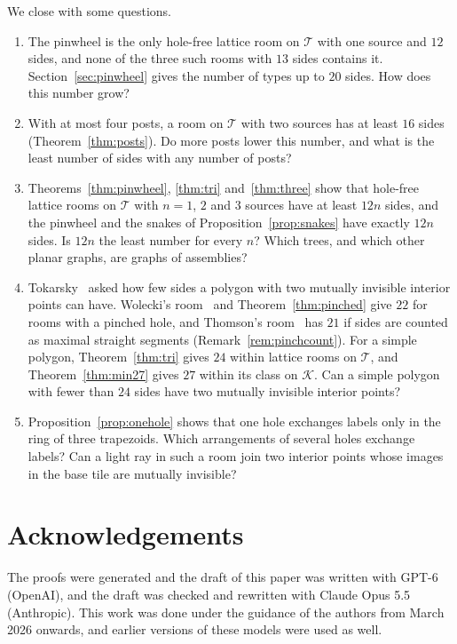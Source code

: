 \documentclass[11pt,a4paper]{article}
\theoremstyle{plain}
\theoremstyle{definition}
\theoremstyle{remark}
\newcommand{\T}{\mathcal{T}}
\newcommand{\K}{\mathcal{K}}
\numberwithin{equation}{section}
\begin{document}
We close with some questions.
\begin{enumerate}[label=\arabic*.]
\item The pinwheel is the only hole-free lattice room on $\T$ with one source and $12$ sides, and none of the three such rooms with $13$ sides contains it. Section~\ref{sec:pinwheel} gives the number of types up to $20$ sides. How does this number grow?
\item With at most four posts, a room on $\T$ with two sources has at least $16$ sides (Theorem~\ref{thm:posts}). Do more posts lower this number, and what is the least number of sides with any number of posts?
\item Theorems~\ref{thm:pinwheel}, \ref{thm:tri} and~\ref{thm:three} show that hole-free lattice rooms on $\T$ with $n=1$, $2$ and $3$ sources have at least $12n$ sides, and the pinwheel and the snakes of Proposition~\ref{prop:snakes} have exactly $12n$ sides. Is $12n$ the least number for every $n$? Which trees, and which other planar graphs, are graphs of assemblies?
\item Tokarsky~\cite[Example~3]{Tok95} asked how few sides a polygon with two mutually invisible interior points can have. Wolecki's room~\cite{Wolecki} and Theorem~\ref{thm:pinched} give $22$ for rooms with a pinched hole, and Thomson's room~\cite{Thomson} has $21$ if sides are counted as maximal straight segments (Remark~\ref{rem:pinchcount}). For a simple polygon, Theorem~\ref{thm:tri} gives $24$ within lattice rooms on $\T$, and Theorem~\ref{thm:min27} gives $27$ within its class on $\K$. Can a simple polygon with fewer than $24$ sides have two mutually invisible interior points?
\item Proposition~\ref{prop:onehole} shows that one hole exchanges labels only in the ring of three trapezoids. Which arrangements of several holes exchange labels? Can a light ray in such a room join two interior points whose images in the base tile are mutually invisible?
\end{enumerate}

\section*{Acknowledgements}
The proofs were generated and the draft of this paper was written with GPT-6 (OpenAI), and the draft was checked and rewritten with Claude Opus 5.5 (Anthropic). This work was done under the guidance of the authors from March 2026 onwards, and earlier versions of these models were used as well.
\end{document}
